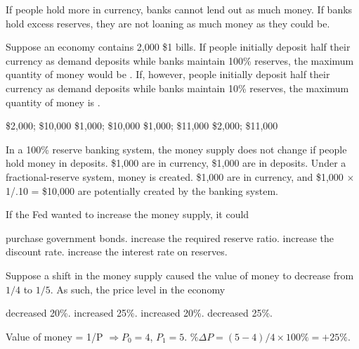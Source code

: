 \documentclass[addpoints,11pt]{exam}
\theoremstyle{definition}
\newcommand{\blank}[0]{\underline{\hspace{3cm}}}
\begin{document}
\begin{questions}
	\begin{solution}
		If people hold more in currency, banks cannot lend out as much money. If banks hold excess reserves, they are not loaning as much money as they could be.
	\end{solution}
	
	\question Suppose an economy contains 2,000 \$1 bills. If people initially deposit half their currency as demand deposits while banks maintain 100\% reserves, the maximum quantity of money would be \blank. If, however, people initially deposit half their currency as demand deposits while banks maintain 10\% reserves, the maximum quantity of money is \blank.
	
	\begin{choices}
		\choice \$2,000; \$10,000
		\choice \$1,000; \$10,000
		\choice \$1,000; \$11,000
		\CorrectChoice \$2,000; \$11,000
	\end{choices}
	
	\begin{solution}
		In a 100\% reserve banking system, the money supply does not change if people hold money in deposits. \$1,000 are in currency, \$1,000 are in deposits. Under a fractional-reserve system, money is created. \$1,000 are in currency, and \$1,000 $\times$ 1/.10 = \$10,000 are potentially created by the banking system.
	\end{solution}
	
\newpage
	
	\question If the Fed wanted to increase the money supply, it could
	
	\begin{choices}
		\CorrectChoice purchase government bonds.
		\choice increase the required reserve ratio.
		\choice increase the discount rate.
		\choice increase the interest rate on reserves.
	\end{choices}
	
	

	
	\question Suppose a shift in the money supply caused the value of money to decrease from $1/4$ to $1/5$. As such, the price level in the economy
	
	\begin{choices}
		\choice decreased 20\%.
		\CorrectChoice increased 25\%.
		\choice increased 20\%.
		\choice decreased 25\%.
	\end{choices}
	
	\begin{solution}
		Value of money = 1/P $\Rightarrow P_0 = 4$, $P_1 = 5$. $\%\Delta P = (5-4)/4 \times 100\% = +25\%$.
	\end{solution}
	

\end{questions}
\end{document}
